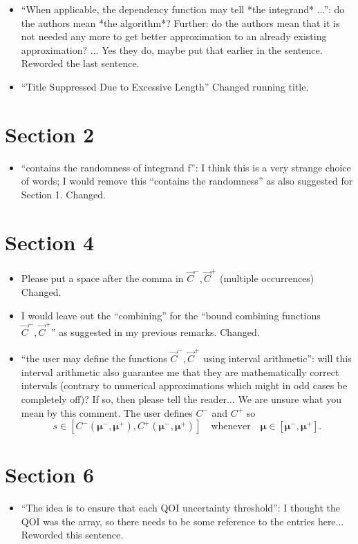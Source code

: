 \documentclass{article}[12pt]
\newcommand{\Referee}[1]{{\color{blue} #1 \newline}}
\begin{document}
\begin{itemize}
    \item \Referee{``When applicable, the dependency function may tell *the integrand* ...'': do the authors mean *the algorithm*? Further: do the authors mean that it is not needed any more to get better approximation to an already existing approximation? ... Yes they do, maybe put that earlier in the sentence.}Reworded the last sentence. 
    \item \Referee{``Title Suppressed Due to Excessive Length''}Changed running title. 
\end{itemize}

\section*{Section 2}

\begin{itemize}
    \item \Referee{``contains the randomness of integrand f'': I think this is a very strange choice of words; I would remove this ``contains the randomness'' as also suggested for Section 1.}Changed.
\end{itemize}

\section*{Section 4}

\begin{itemize}
    \item \Referee{Please put a space after the comma in $\vec{C}^-, \vec{C}^+$ (multiple occurrences)}Changed.
    \item \Referee{I would leave out the ``combining'' for the ``bound combining functions $\vec{C}^-, \vec{C}^+$'' as suggested in my previous remarks.}Changed.
    \item \Referee{``the user may define the functions $\vec{C}^-, \vec{C}^+$ using interval arithmetic'': will this interval arithmetic also guarantee me that they are mathematically correct intervals (contrary to numerical approximations which might in odd cases be completely off)? If so, then please tell the reader...}We are unsure what you mean by this comment. The user defines $C^-$ and $C^+$ so 
    $$s \in [C^-(\boldsymbol{\mu}^-,\boldsymbol{\mu}^+),C^+(\boldsymbol{\mu}^-,\boldsymbol{\mu}^+)] \quad\text{whenever}\quad \boldsymbol{\mu} \in [\boldsymbol{\mu}^-,\boldsymbol{\mu}^+].$$
\end{itemize}

\section*{Section 6}

\begin{itemize}
    \item \Referee{``The idea is to ensure that each QOI uncertainty threshold'': I thought the QOI was the array, so there needs to be some reference to the entries here...}Reworded this sentence.
\end{itemize}
\end{document}
